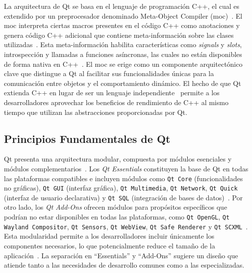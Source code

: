 La arquitectura de Qt se basa en el lenguaje de programación C++, el cual es extendido por un preprocesador denominado Meta-Object Compiler (moc)~\cite{qt_wiki}. El moc interpreta ciertas macros presentes en el código C++ como anotaciones y genera código C++ adicional que contiene meta-información sobre las clases utilizadas~\cite{qt_wiki}. Esta meta-información habilita características como \textit{signals} y \textit{slots}, introspección y llamadas a funciones asíncronas, las cuales no están disponibles de forma nativa en C++~\cite{qt_wiki}. El moc se erige como un componente arquitectónico clave que distingue a Qt al facilitar sus funcionalidades únicas para la comunicación entre objetos y el comportamiento dinámico. El hecho de que Qt extienda C++ en lugar de ser un lenguaje independiente~\cite{qt_wiki} permite a los desarrolladores aprovechar los beneficios de rendimiento de C++ al mismo tiempo que utilizan las abstracciones proporcionadas por Qt.

\subsection{Principios Fundamentales de Qt}
Qt presenta una arquitectura modular, compuesta por módulos esenciales y módulos complementarios~\cite{qt_wiki}. Los \textit{Qt Essentials} constituyen la base de Qt en todas las plataformas compatibles e incluyen módulos como \texttt{Qt Core} (funcionalidades no gráficas), \texttt{Qt GUI} (interfaz gráfica), \texttt{Qt Multimedia}, \texttt{Qt Network}, \texttt{Qt Quick} (interfaz de usuario declarativa) y \texttt{Qt SQL} (integración de bases de datos)~\cite{qt_framework}. Por otro lado, los \textit{Qt Add-Ons} ofrecen módulos para propósitos específicos que podrían no estar disponibles en todas las plataformas, como \texttt{Qt OpenGL}, \texttt{Qt Wayland Compositor}, \texttt{Qt Sensors}, \texttt{Qt WebView}, \texttt{Qt Safe Renderer} y \texttt{Qt SCXML}~\cite{qt_framework}. Esta modularidad permite a los desarrolladores incluir únicamente los componentes necesarios, lo que potencialmente reduce el tamaño de la aplicación~\cite{qt_framework}. La separación en ``Essentials'' y ``Add-Ons'' sugiere un diseño que atiende tanto a las necesidades de desarrollo comunes como a las especializadas.

